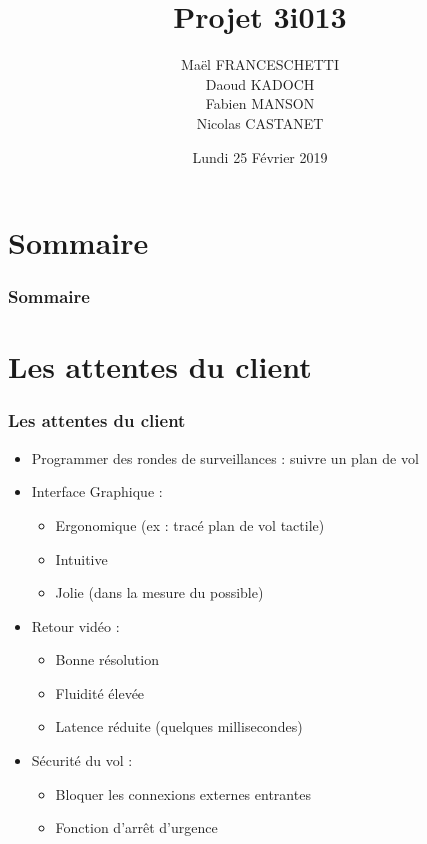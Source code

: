 \documentclass[11pt]{beamer}
\author{Maël FRANCESCHETTI\\Daoud KADOCH\\Fabien MANSON\\Nicolas CASTANET}
\title{Projet 3i013}
\institute{Sorbonne Université}
\date{Lundi 25 Février 2019}
\begin{document}
\begin{frame}
\titlepage
\end{frame}

\section{Sommaire}
\begin{frame}
\frametitle{Sommaire}
\tableofcontents[sections={1-8}]
\end{frame}




\section{Les attentes du client}
\begin{frame}
\frametitle{Les attentes du client}
\begin{itemize}
\item Programmer des rondes de surveillances : suivre un plan de vol
\item Interface Graphique : 
\begin{itemize}
\item Ergonomique (ex : tracé plan de vol tactile)
\item Intuitive 
\item Jolie (dans la mesure du possible)
\end{itemize}
\item Retour vidéo :
\begin{itemize}
\item Bonne résolution
\item Fluidité élevée
\item Latence réduite (quelques millisecondes)
\end{itemize}
\item Sécurité du vol :
\begin{itemize}
\item Bloquer les connexions externes entrantes
\item Fonction d'arrêt d'urgence
\end{itemize}

\end{itemize}
\end{frame}
\end{document}
